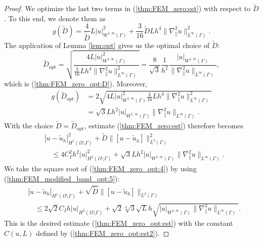 \documentclass{article}
\theoremstyle{remark}
\def\WIi{W^{1,\infty}}
\def\tu{\tilde{u}}
\def\opt{\mathrm{opt}}
\def\gradt{\nabla_{\!\!{\scriptscriptstyle\parallel}}}
\def\tD{\widetilde{D}}
\begin{document}
\begin{proof}
We optimize the last two terms in (\ref{thm:FEM_zero:est}) with respect to $\tD$. To this end, we denote them as
\begin{equation}
\label{thm:FEM_zero_opt:1}
g(\tD)= \frac{4}{\tD}L |u|_{\WIi(\Gamma)}^2 +\frac{3}{16}\tD L h^4 \|\gradt^2 u\|^2_{L^\infty(\Gamma)}.
\end{equation}
The application of Lemma \ref{lem:opt} gives us the optimal choice of $\tD$:
\begin{equation}
\label{thm:FEM_zero_opt:2}
\tD_\opt=\sqrt{\frac{4L |u|_{\WIi(\Gamma)}^2}{\tfrac{3}{16} L h^4 \|\gradt^2 u\|^2_{L^\infty(\Gamma)}}} =\frac{8}{\sqrt{3}}\frac{1}{h^2}\frac{|u|_{\WIi(\Gamma)}}{\|\gradt^2 u\|_{L^\infty(\Gamma)}},
\end{equation}
which is (\ref{thm:FEM_zero_opt:D}). Moreover,
\begin{equation}
\begin{split}
\label{thm:FEM_zero_opt:3}
g(\tD_\opt)&= 2\sqrt{4L |u|_{\WIi(\Gamma)}^2  \tfrac{3}{16} L h^4 \|\gradt^2 u\|^2_{L^\infty(\Gamma)}}\\ &=\sqrt{3}L h^2 |u|_{\WIi(\Gamma)}\|\gradt^2 u\|_{L^\infty(\Gamma)}.
\end{split}
\end{equation}
With the choice $\tD=\tD_\opt$, estimate (\ref{thm:FEM_zero:est}) therefore becomes
\begin{equation}
\begin{split}
\label{thm:FEM_zero_opt:4}
&|u-\tu_h|^2_{H^1(\Omega\setminus\Gamma)} +\tD\|[u-\tu_h]\|_{L^2(\Gamma)}^2 \\
&\quad\leq 4C_I^2h^2|u|^2_{H^2(\Omega\setminus\Gamma)}  +\sqrt{3}L h^2 |u|_{\WIi(\Gamma)}\|\gradt^2 u\|_{L^\infty(\Gamma)}.
\end{split}
\end{equation}
We take the square root of (\ref{thm:FEM_zero_opt:4}) by using (\ref{thm:FEM_modified_band_opt:5}):
\begin{equation}
\begin{split}
\label{thm:FEM_zero_opt:6}
&|u-\tu_h|_{H^1(\Omega\setminus\Gamma)} +\sqrt{\tD}\big\|[u-\tu_h]\big\|_{L^2(\Gamma)}\\
&\quad\leq 2\sqrt{2}C_Ih|u|_{H^2(\Omega\setminus\Gamma)}  +\sqrt{2}\sqrt[4]{3}\sqrt{L} h \sqrt{|u|_{\WIi(\Gamma)}\|\gradt^2 u\|_{L^\infty(\Gamma)}}.
\end{split}
\end{equation}
This is the desired estimate (\ref{thm:FEM_zero_opt:est}) with the constant $C(u,L)$ defined by (\ref{thm:FEM_zero_opt:est2}).
\end{proof}
\end{document}
